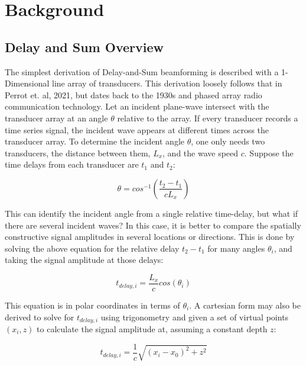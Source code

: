\chapter{Background}
\label{chapter2:background}
\graphicspath{{Chapter-2/graphics/}}

\section{Delay and Sum Overview}
\label{chapter2:das_Overview}

    The simplest derivation of Delay-and-Sum beamforming is described with a 1-Dimensional line array of transducers. This derivation loosely follows that in Perrot et. al, 2021\cite{perrotYouThinkYou2021a}, but dates back to the 1930s and phased array radio communication technology\cite{1686435}. Let an incident plane-wave intersect with the transducer array at an angle $\theta$ relative to the array. If every transducer records a time series signal, the incident wave appears at different times across the transducer array. To determine the incident angle $\theta$, one only needs two transducers, the distance between them, $L_x$, and the wave speed $c$. Suppose the time delays from each transducer are $t_1$ and $t_2$:

    \begin{equation} 
        \theta = cos^{-1}(\frac{t_2 - t_1}{c L_x})
    \end{equation}

    This can identify the incident angle from a single relative time-delay, but what if there are several incident waves? In this case, it is better to compare the spatially constructive signal amplitudes in several locations or directions. This is done by solving the above equation for the relative delay $t_2 - t_1$ for many angles $\theta_i$, and taking the signal amplitude at those delays:

    \begin{equation}
        t_{delay,i} = \frac{L_x}{c} cos(\theta_i)
    \end{equation}

    This equation is in polar coordinates in terms of $\theta_i$. A cartesian form may also be derived to solve for $t_{delay,i}$ using trigonometry and given a set of virtual points $(x_i,z)$ to calculate the signal amplitude at, assuming a constant depth $z$:

    \begin{equation} \label{eq:timedelay}
        t_{delay,i} = \frac{1}{c} \sqrt{(x_i - x_0)^2 + z^2}
    \end{equation}

